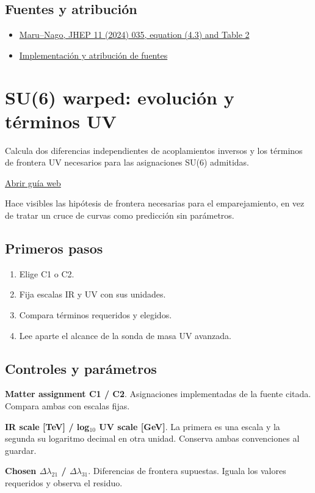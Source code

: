 \documentclass[11pt,a4paper]{article}
\begin{document}
\subsection*{Fuentes y atribución}
\begin{itemize}
\item \href{https://doi.org/10.1007/JHEP11(2024)035}{Maru--Nago, JHEP 11 (2024) 035, equation (4.3) and Table 2}
\item \href{https://github.com/karlesmarin/ghu-lab/blob/main/src/modules/su6_maru_nago.mjs}{Implementación y atribución de fuentes}
\end{itemize}
\section{SU(6) warped: evolución y términos UV}
Calcula dos diferencias independientes de acoplamientos inversos y los términos de frontera UV necesarios para las asignaciones SU(6) admitidas.

\href{https://karlesmarin.github.io/ghu-explorer/guide/es/rsrunning/index.html}{Abrir guía web}

Hace visibles las hipótesis de frontera necesarias para el emparejamiento, en vez de tratar un cruce de curvas como predicción sin parámetros.
\subsection*{Primeros pasos}
\begin{enumerate}
\item Elige C1 o C2.
\item Fija escalas IR y UV con sus unidades.
\item Compara términos requeridos y elegidos.
\item Lee aparte el alcance de la sonda de masa UV avanzada.
\end{enumerate}
\subsection*{Controles y parámetros}
\textbf{Matter assignment C1 / C2}. Asignaciones implementadas de la fuente citada. Compara ambas con escalas fijas.

\textbf{IR scale [TeV] / log\ensuremath{{}_{10}} UV scale [GeV]}. La primera es una escala y la segunda su logaritmo decimal en otra unidad. Conserva ambas convenciones al guardar.

\textbf{Chosen \ensuremath{\Delta}\ensuremath{\lambda}\ensuremath{{}_{21}} / \ensuremath{\Delta}\ensuremath{\lambda}\ensuremath{{}_{31}}}. Diferencias de frontera supuestas. Iguala los valores requeridos y observa el residuo.
\end{document}

